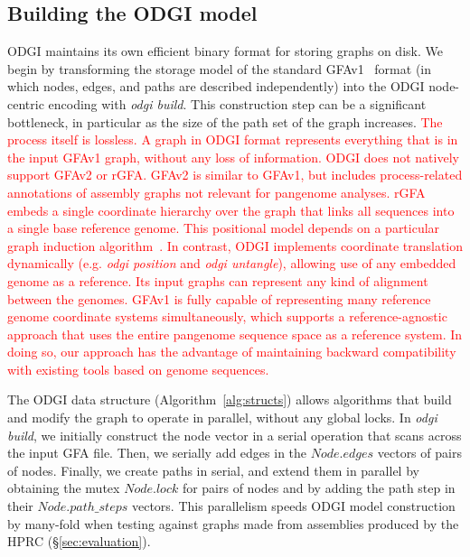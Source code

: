 \documentclass{bioinfo}
\newcommand{\REVIEWED}[1]{{\textcolor{Red}{#1}}}
\begin{document}



\subsection{Building the \textsc{ODGI} model}
\label{sec:build}
ODGI maintains its own efficient binary format for storing graphs on disk.
We begin by transforming the storage model of the standard GFAv1~\citep{GFA} format (in which nodes, edges, and paths are described independently) into the ODGI node-centric encoding with \textit{odgi build}.
This construction step can be a significant bottleneck, in particular as the size of the path set of the graph increases. \REVIEWED{The process itself is lossless. A graph in ODGI format represents everything that is in the input GFAv1 graph, without any loss of information.} \REVIEWED{ODGI does not natively support GFAv2 or rGFA.
GFAv2 is similar to GFAv1, but includes process-related annotations of assembly graphs not relevant for pangenome analyses.
rGFA embeds a single coordinate hierarchy over the graph that links all sequences into a single base reference genome.
This positional model depends on a particular graph induction algorithm~\cite{Li:2020}.
In contrast, ODGI implements coordinate translation dynamically (e.g. \textit{odgi position} and \textit{odgi untangle}), allowing use of any embedded genome as a reference.
Its input graphs can represent any kind of alignment between the genomes.
GFAv1 is fully capable of representing many reference genome coordinate systems simultaneously, which supports a reference-agnostic approach that uses the entire pangenome sequence space as a reference system.
In doing so, our approach has the advantage of maintaining backward compatibility with existing tools based on genome sequences.
}

The ODGI data structure (Algorithm~\ref{alg:structs}) allows algorithms that build and modify the graph to operate in parallel, without any global locks.
In \textit{odgi build}, we initially construct the node vector in a serial operation that scans across the input GFA file.
Then, we serially add edges in the $Node.edges$ vectors of pairs of nodes.
Finally, we create paths in serial, and extend them in parallel by obtaining the mutex $Node.lock$ for pairs of nodes and by adding the path step in their $Node.path\_steps$ vectors.
This parallelism speeds ODGI model construction by many-fold when testing against graphs made from assemblies produced by the HPRC (\S\ref{sec:evaluation}).
\end{document}
